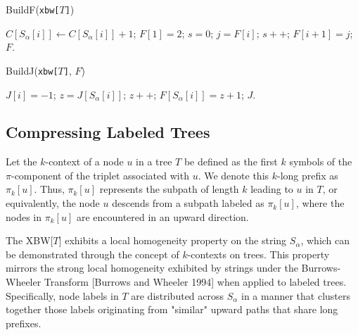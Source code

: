 \begin{algorithm}[H]
    \caption{BuildF(\texttt{xbw[$T$]})}
    \label{alg:buildF}
    \begin{algorithmic}[1]
        \State $C[S_\alpha[i]] \gets C[S_\alpha[i]] + 1$; 
    \EndFor
    \State $F[1] = 2$; 
     
        \State $s = 0$; $j = F[i]$;
         
             $s++$; 
            \EndIf
        \EndWhile
        \State $F[i+1] = j$;
    \EndFor
    \State \Return $F$.
    \end{algorithmic}
\end{algorithm}
    
\begin{algorithm}[H]
    \caption{BuildJ(\texttt{xbw[$T$]}, $F$)}
    \begin{algorithmic}[1]
            \State $J[i] = -1$; 
        \Else
            \State $z = J[S_\alpha[i]]$;
             $z++$; 
            \EndWhile
            \State $F[S_\alpha[i]] = z + 1$;
        \EndIf
    \EndFor
    \State \Return $J$.
    \end{algorithmic}
\end{algorithm}

\subsection{Compressing Labeled Trees}
Let the $k$-context of a node $u$ in a tree $T$ be defined as the first $k$ symbols of the $\pi$-component of the triplet associated with $u$. We denote this $k$-long prefix as $\pi_k[u]$. Thus, $\pi_k[u]$ represents the subpath of length $k$ leading to $u$ in $T$, or equivalently, the node $u$ descends from a subpath labeled as $\pi_k[u]$, where the nodes in $\pi_k[u]$ are encountered in an upward direction.

The XBW[$T$] exhibits a local homogeneity property on the string $S_{\alpha}$, which can be demonstrated through the concept of $k$-contexts on trees. This property mirrors the strong local homogeneity exhibited by strings under the Burrows-Wheeler Transform [Burrows and Wheeler 1994] when applied to labeled trees. Specifically, node labels in $T$ are distributed across $S_{\alpha}$ in a manner that clusters together those labels originating from "similar" upward paths that share long prefixes. 

